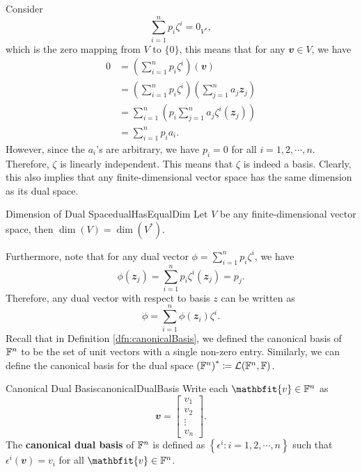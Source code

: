 \documentclass[math]{amznotes}
\theoremstyle{remark}
\begin{document}
Consider
\begin{equation*}
    \sum_{i = 1}^{n}p_i\zeta^i = 0_{V^*},
\end{equation*}
which is the zero mapping from $V$ to $\{0\}$, this means that for any $\mathbfit{v} \in V$, we have
\begin{align*}
    0 & = \left(\sum_{i = 1}^{n}p_i\zeta^i\right)(\mathbfit{v}) \\
    & = \left(\sum_{i = 1}^{n}p_i\zeta^i\right)\left(\sum_{j = 1}^{n}a_j\mathbfit{z}_j\right) \\
    & = \sum_{i = 1}^{n}\left(p_i\sum_{j = 1}^{n}a_j\zeta^i(\mathbfit{z}_j)\right) \\
    & = \sum_{i = 1}^{n}p_ia_i.
\end{align*}
However, since the $a_i$'s are arbitrary, we have $p_i = 0$ for all $i = 1, 2, \cdots, n$. Therefore, $\zeta$ is linearly independent. This means that $\zeta$ is indeed a basis. Clearly, this also implies that any finite-dimensional vector space has the same dimension as its dual space. 
\begin{probox}{Dimension of Dual Space}{dualHasEqualDim}
    Let $V$ be any finite-dimensional vector space, then $\dim(V) = \dim\left(V^*\right)$.
\end{probox}
Furthermore, note that for any dual vector $\phi = \sum_{i = 1}^{n}p_i\zeta^i$, we have
\begin{equation*}
    \phi(\mathbfit{z}_j) = \sum_{i = 1}^{n}p_i\zeta^i(\mathbfit{z}_j) = p_j.
\end{equation*}
Therefore, any dual vector with respect to basis $z$ can be written as
\begin{equation*}
    \phi = \sum_{i = 1}^{n}\phi(\mathbfit{z}_i)\zeta^i.
\end{equation*}
Recall that in Definition \ref{dfn:canonicalBasis}, we defined the canonical basis of $\mathbb{F}^n$ to be the set of unit vectors with a single non-zero entry. Similarly, we can define the canonical basis for the dual space $\left(\mathbb{F}^n\right)^* \coloneqq \mathcal{L}(\mathbb{F}^n, \mathbb{F})$.
\begin{dfnbox}{Canonical Dual Basis}{canonicalDualBasis}
    Write each $\mathbfit{v} \in \F^n$ as
    \begin{equation*}
        \mathbfit{v} = \begin{bmatrix}
            v_1 \\
            v_2 \\
            \vdots \\
            v_n
        \end{bmatrix}.
    \end{equation*}
    The {\color{red} \textbf{canonical dual basis}} of $\mathbb{F}^n$ is defined as $\left\{\epsilon^i \colon i = 1, 2, \cdots, n\right\}$ such that $\epsilon^i(\mathbfit{v}) = v_i$ for all $\mathbfit{v} \in \F^n$.
\end{dfnbox}
\end{document}
